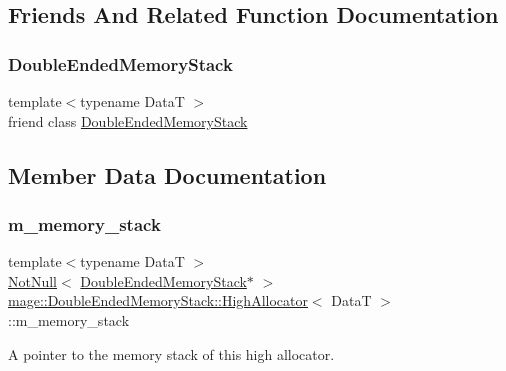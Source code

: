 \subsection{Friends And Related Function Documentation}
\hypertarget{classmage_1_1_double_ended_memory_stack_1_1_high_allocator_a10ae729d55b8c0017057250445835680}{}\label{classmage_1_1_double_ended_memory_stack_1_1_high_allocator_a10ae729d55b8c0017057250445835680} 
\subsubsection{\texorpdfstring{Double\+Ended\+Memory\+Stack}{DoubleEndedMemoryStack}}
{\footnotesize\ttfamily template$<$typename DataT $>$ \\
friend class \hyperlink{classmage_1_1_double_ended_memory_stack}{Double\+Ended\+Memory\+Stack}\hspace{0.3cm}{\ttfamily [friend]}}



\subsection{Member Data Documentation}
\hypertarget{classmage_1_1_double_ended_memory_stack_1_1_high_allocator_a5210ee9e229a0d91fc159ea3abb5fcbf}{}\label{classmage_1_1_double_ended_memory_stack_1_1_high_allocator_a5210ee9e229a0d91fc159ea3abb5fcbf} 
\subsubsection{\texorpdfstring{m\+\_\+memory\+\_\+stack}{m\_memory\_stack}}
{\footnotesize\ttfamily template$<$typename DataT $>$ \\
\hyperlink{namespacemage_a8769f9d670d6b585ea306cb1062af94b}{Not\+Null}$<$ \hyperlink{classmage_1_1_double_ended_memory_stack}{Double\+Ended\+Memory\+Stack}$\ast$ $>$ \hyperlink{classmage_1_1_double_ended_memory_stack_1_1_high_allocator}{mage\+::\+Double\+Ended\+Memory\+Stack\+::\+High\+Allocator}$<$ DataT $>$\+::m\+\_\+memory\+\_\+stack\hspace{0.3cm}{\ttfamily [private]}}

A pointer to the memory stack of this high allocator. 